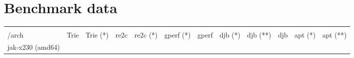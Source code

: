 \documentclass[parskip=half]{scrartcl}
\begin{document}
\section{Benchmark data}
\begin{table}[h]
\begin{tabular}{@{}llllllllllll@{}}
\toprule
\begin{minipage}[b]{0.12\columnwidth}\raggedright\strut
function\\/arch\strut
\end{minipage} & \begin{minipage}[b]{0.05\columnwidth}\raggedright\strut
Trie\strut
\end{minipage} & \begin{minipage}[b]{0.05\columnwidth}\raggedright\strut
Trie (*)\strut
\end{minipage} & \begin{minipage}[b]{0.05\columnwidth}\raggedright\strut
re2c\strut
\end{minipage} & \begin{minipage}[b]{0.05\columnwidth}\raggedright\strut
re2c (*)\strut
\end{minipage} & \begin{minipage}[b]{0.05\columnwidth}\raggedright\strut
gperf (*)\strut
\end{minipage} & \begin{minipage}[b]{0.05\columnwidth}\raggedright\strut
gperf\strut
\end{minipage} & \begin{minipage}[b]{0.05\columnwidth}\raggedright\strut
djb (*)\strut
\end{minipage} & \begin{minipage}[b]{0.05\columnwidth}\raggedright\strut
djb (**)\strut
\end{minipage} & \begin{minipage}[b]{0.05\columnwidth}\raggedright\strut
djb\strut
\end{minipage} & \begin{minipage}[b]{0.05\columnwidth}\raggedright\strut
apt (*)\strut
\end{minipage} & \begin{minipage}[b]{0.05\columnwidth}\raggedright\strut
apt (**)\strut
\end{minipage}\tabularnewline
\midrule
\begin{minipage}[t]{0.12\columnwidth}\raggedright\strut
jak-x230 (amd64)\strut
\end{minipage} & \begin{minipage}[t]{0.05\columnwidth}\raggedright\strut

\end{minipage}
\end{tabular}
\end{table}
\end{document}
